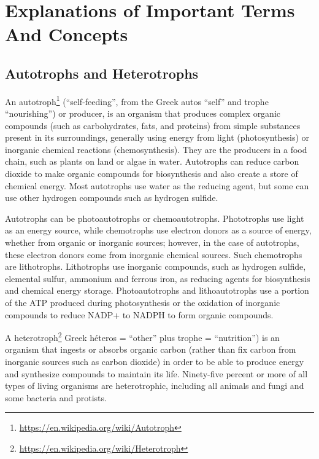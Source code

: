\documentclass[]{book}
\let\rmarkdownfootnote\footnote%
\def\footnote{\protect\rmarkdownfootnote}
\renewcommand{\href}[2]{#2\footnote{\url{#1}}}
\theoremstyle{definition}
\theoremstyle{definition}
\theoremstyle{definition}
\theoremstyle{remark}
\begin{document}
\appendix


\chapter{Explanations of Important Terms And
Concepts}\label{explanations-of-important-terms-and-concepts}

\section{Autotrophs and Heterotrophs}\label{autotrophs-and-heterotrophs}

An \href{https://en.wikipedia.org/wiki/Autotroph}{autotroph}
(``self-feeding'', from the Greek autos ``self'' and trophe
``nourishing'') or producer, is an organism that produces complex
organic compounds (such as carbohydrates, fats, and proteins) from
simple substances present in its surroundings, generally using energy
from light (photosynthesis) or inorganic chemical reactions
(chemosynthesis). They are the producers in a food chain, such as plants
on land or algae in water. Autotrophs can reduce carbon dioxide to make
organic compounds for biosynthesis and also create a store of chemical
energy. Most autotrophs use water as the reducing agent, but some can
use other hydrogen compounds such as hydrogen sulfide.

Autotrophs can be photoautotrophs or chemoautotrophs. Phototrophs use
light as an energy source, while chemotrophs use electron donors as a
source of energy, whether from organic or inorganic sources; however, in
the case of autotrophs, these electron donors come from inorganic
chemical sources. Such chemotrophs are lithotrophs. Lithotrophs use
inorganic compounds, such as hydrogen sulfide, elemental sulfur,
ammonium and ferrous iron, as reducing agents for biosynthesis and
chemical energy storage. Photoautotrophs and lithoautotrophs use a
portion of the ATP produced during photosynthesis or the oxidation of
inorganic compounds to reduce NADP+ to NADPH to form organic compounds.

A \href{https://en.wikipedia.org/wiki/Heterotroph}{heterotroph} Greek
héteros = ``other'' plus trophe = ``nutrition'') is an organism that
ingests or absorbs organic carbon (rather than fix carbon from inorganic
sources such as carbon dioxide) in order to be able to produce energy
and synthesize compounds to maintain its life. Ninety-five percent or
more of all types of living organisms are heterotrophic, including all
animals and fungi and some bacteria and protists.
\end{document}
